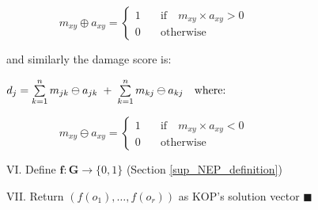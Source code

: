                    \qquad $\hspace{2cm}m_{xy} \oplus a_{xy}  =	\scriptscriptstyle{\begin{cases}	%
                                                        1 & \quad\textrm{if}\quad m_{xy} \times a_{xy} >0 \\
                                                        0 & \quad\textrm{otherwise}
                                                \end{cases}
                                                }$

                    \qquad and similarly the damage score is:

                    \qquad $d_j = \sum\limits_{k=1}^{n} m_{jk} \ominus a_{jk} \hspace{0.1cm}+\hspace{0.1cm} \sum\limits_{k=1}^{n} m_{kj} \ominus a_{kj} \quad\textrm{where:}$

                    \qquad $\hspace{2cm}m_{xy} \ominus a_{xy}  = \scriptscriptstyle{\begin{cases}	%
                                                        1 & \quad\textrm{if}\quad m_{xy} \times a_{xy} < 0 \\
                                                        0 & \quad\textrm{otherwise}
                                                \end{cases}
                                                }$


            \noindent VI. Define $\boldsymbol{f}:\boldsymbol{G}  \rightarrow \{0,1\}$ (Section \ref{sup_NEP_definition})


            \noindent  VII. Return $(f(o_1), \dots, f(o_r))$ as KOP's solution vector \hspace{5pt} $\blacksquare$


\printbibliography

